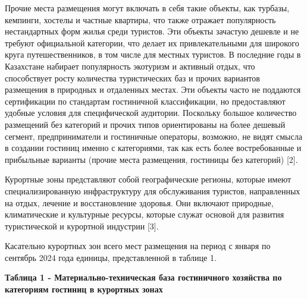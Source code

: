 \begin{multicols}{2}
Прочие места размещения могут включать в себя такие объекты, как
турбазы, кемпинги, хостелы и частные квартиры, что также отражает
популярность нестандартных форм жилья среди туристов. Эти объекты
зачастую дешевле и не требуют официальной категории, что делает их
привлекательными для широкого круга путешественников, в том числе для
местных туристов. В последние годы в Казахстане набирает популярность
экотуризм и активный отдых, что способствует росту количества
туристических баз и прочих вариантов размещения в природных и отдаленных
местах. Эти объекты часто не поддаются сертификации по стандартам
гостиничной классификации, но предоставляют удобные условия для
специфической аудитории. Поскольку большое количество размещений без
категорий и прочих типов ориентированы на более дешевый сегмент,
предприниматели и гостиничные операторы, возможно, не видят смысла в
создании гостиниц именно с категориями, так как есть более
востребованные и прибыльные варианты (прочие места размещения, гостиницы
без категорий) {[}2{]}.

Курортные зоны представляют собой географические регионы, которые имеют
специализированную инфраструктуру для обслуживания туристов,
направленных на отдых, лечение и восстановление здоровья. Они включают
природные, климатические и культурные ресурсы, которые служат основой
для развития туристической и курортной индустрии {[}3{]}.

Касательно курортных зон всего мест размещения на период с января по
сентябрь 2024 года  единицы, представленной в таблице 1.
\end{multicols}

{\bfseries Таблица 1 - Материально-техническая база гостиничного хозяйства
по категориям гостиниц в курортных зонах}


